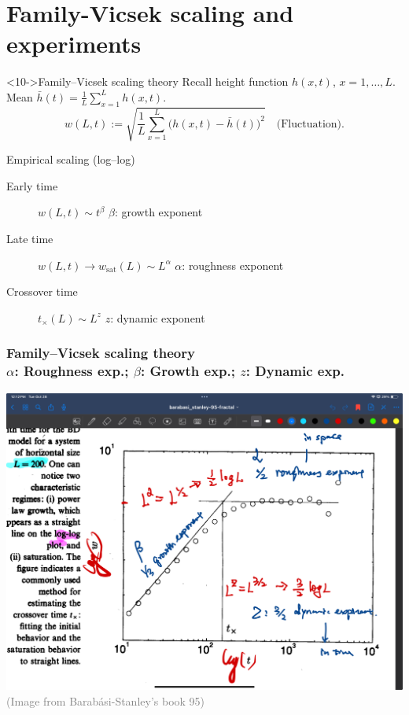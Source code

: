 \documentclass[9pt,table,xcolor=dvipsnames]{beamer}
\begin{document}
\section{Family-Vicsek scaling and experiments}

\begin{frame}<10->{Family--Vicsek scaling theory}
  \small Recall height function $h(x,t)$, $x = 1, \dots,L$. Mean $\bar
  h(t)=\frac1L\sum_{x=1}^L h(x,t)$.
  \[
    w(L,t)
    :=\sqrt{\frac1L\sum_{x=1}^L\big(h(x,t)-\bar h(t)\big)^2}
    \quad\text{(Fluctuation)}.
  \]
  \begin{assblock}{Empirical scaling (log--log)}
    \small
    \begin{description}
      \item[Early time] $w(L,t)\sim t^{\beta}$ \hfill {\footnotesize $\beta$: growth exponent}
      \item[Late time] $w(L,t)\to w_{\mathrm{sat}}(L)\sim L^{\alpha}$ \hfill {\footnotesize $\alpha$: roughness exponent}
      \item[Crossover time] $t_\times(L)\sim L^{z}$ \hfill {\footnotesize $z$: dynamic exponent}
    \end{description}
  \end{assblock}

\end{frame}
\begin{frame}[fragile,t] %
 \frametitle{Family--Vicsek scaling theory \\
 \small $\alpha$: Roughness exp.; $\beta$: Growth exp.; $z$: Dynamic exp.}
  \begin{center}
    \includegraphics[width=0.9\linewidth]{./figs/log-log_Illistrutaion.jpg} \\

    \vfill{\footnotesize \textcolor{gray}{(Image from Barab\'asi-Stanley's book
    95)}}
  \end{center}
\end{frame}
\end{document}

